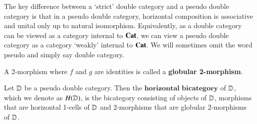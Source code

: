 \documentclass{amsart}
\begin{document}
The key difference between a `strict' double category and a pseudo double category is that in a pseudo double category, horizontal composition is associative and unital only up to natural isomorphism. Equivalently, as a double category can be viewed as a category internal to $\bold{Cat}$, we can view a pseudo double category as a category `weakly' internal to $\bold{Cat}$. We will sometimes omit the word pseudo and simply say double category.

\begin{defn}
A 2-morphism where $f$ and $g$ are identities is called a \textbf{globular 2-morphism}.
\end{defn}

\begin{defn}
Let $\mathbb{D}$ be a pseudo double category. Then the $\textbf{horizontal bicategory}$ of $\mathbb{D}$, which we denote as $H(\mathbb{D})$, is the bicategory consisting of objects of $\mathbb{D}$, morphisms that are horizontal 1-cells of $\mathbb{D}$ and 2-morphisms that are globular 2-morphisms of $\mathbb{D}$.
\end{defn}
\end{document}
